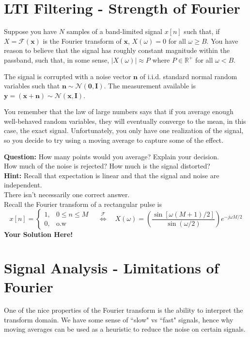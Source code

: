 \documentclass[12pt]{article}
\newcommand{\n}{\mathbf{n}}
\newcommand{\x}{\mathbf{x}}
\newcommand{\y}{\mathbf{y}}
\newcommand{\0}{\mathbf{0}}
\newcommand{\I}{\mathbf{I}}
\newcommand{\solspace}{\vspace{3mm} \textbf{Your Solution Here!} \vspace{3mm}}
\begin{document}
\rhead{\today}

\section{LTI Filtering - Strength of Fourier}
Suppose you have $N$ samples of a band-limited signal $x[n]$ such that, if $X = \mathcal{F}(\x)$ is the Fourier transform of $\x$, $X(\omega) = 0$ for all $\omega \geq B$. 
You have reason to believe that the signal has roughly constant magnitude within the passband, such that, in some sense, $|X(\omega)| \approx P$ where $P \in \mathbb{R}^+$ for all $\omega < B$.

The signal is corrupted with a noise vector $\n$ of  i.i.d. standard normal random variables such that $\n \sim \mathcal{N}(\0,\I)$.
The measurement available is $\y=(\x+\n) \sim \mathcal{N}(\x,\I)$.

You remember that the law of large numbers says that if you average enough well-behaved random variables, they will eventually converge to the mean, in this case, the exact signal.
Unfortunately, you only have one realization of the signal, so you decide to try using a moving average to capture some of the effect.
\vspace{3mm}

\textbf{Question: } How many points would you average? Explain your decision.
\\
How much of the noise is rejected? How much is the signal distorted?
\\
\textbf{Hint: } Recall that expectation is linear and that the signal and noise are independent. \\There isn't necessarily one correct answer.
\\
Recall the Fourier transform of a rectangular pulse is
\begin{equation}
x[n] = \begin{cases}
1, & 0 \leq n \leq M \\
0, & \text{o.w}
\end{cases} \quad
 \overset{ \mathcal{F}}{\Leftrightarrow} \quad X(\omega) = \left(\frac{\sin[\omega(M+1)/2]}{\sin(\omega/2)}\right)e^{-j\omega M/2}
\end{equation}
\solspace

\pagebreak
\section{Signal Analysis - Limitations of Fourier}
One of the nice properties of the Fourier transform is the ability to interpret the transform domain.
We have some sense of ``slow" vs ``fast" signals, hence why moving averages can be used as a heuristic to reduce the noise on certain signals.
\end{document}
